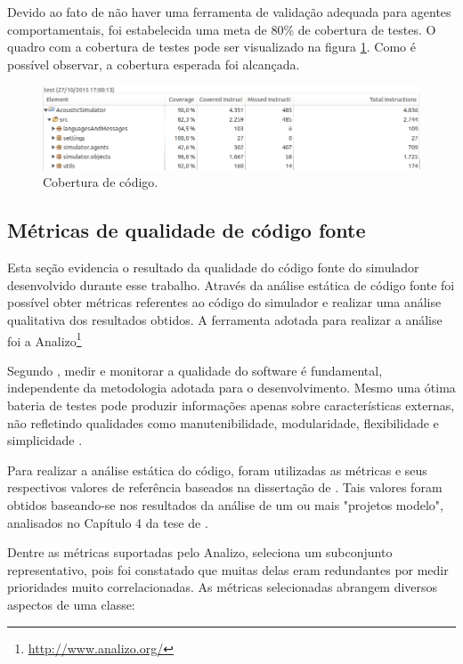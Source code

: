 Devido ao fato de não haver uma ferramenta de validação adequada para agentes comportamentais, foi estabelecida uma meta de 80\% de cobertura de testes. O quadro com a cobertura de testes pode ser visualizado na figura \ref{cobertura}. Como é possível observar, a cobertura esperada foi alcançada.

\begin{figure}[!htb]
\centering
\includegraphics[scale=0.45]{figuras/cobertura}
\caption{Cobertura de código.}
\label{cobertura}
\end{figure}

\subsection{Métricas de qualidade de código fonte}

Esta seção evidencia o resultado da qualidade do código fonte do simulador desenvolvido durante esse trabalho. Através da análise estática de código fonte foi possível obter métricas referentes ao código do simulador e realizar uma análise qualitativa dos resultados obtidos. A ferramenta adotada para realizar a análise foi a Analizo\footnote{\url{http://www.analizo.org/}}

Segundo , medir e monitorar a qualidade do software é fundamental, independente da metodologia adotada para o desenvolvimento. Mesmo uma ótima bateria de testes pode produzir informações apenas sobre características externas, não refletindo qualidades como manutenibilidade, modularidade, flexibilidade e simplicidade \cite{kalibro}.

Para realizar a análise estática do código, foram utilizadas as métricas e seus respectivos valores de referência baseados na dissertação de . Tais valores foram obtidos baseando-se nos resultados da análise de um ou mais "projetos
modelo", analisados no Capítulo 4 da tese de .

Dentre as métricas suportadas pelo Analizo,  seleciona um subconjunto representativo, pois foi constatado que muitas delas eram redundantes por medir prioridades muito correlacionadas. As métricas selecionadas abrangem diversos aspectos de uma classe:

